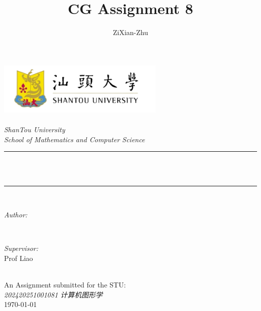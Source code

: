 
\title{CG Assignment 8}
\author{\textup{ZiXian-Zhu}}


\begin{titlepage}
    \newcommand{\HRule}{\rule{\linewidth}{0.5mm}}
    \pagecolor{gray!10} %
    \includegraphics[width=8cm]{figures/stu_logo_3-removebg-preview.png}\\[1cm] 
    \center 
    \quad\\[1.5cm]
    \textsl{\Large ShanTou University}\\[0.5cm] 
    \textsl{\large School of Mathematics and Computer Science}\\[0.5cm] 
    \makeatletter
    \HRule \\[0.4cm]
    { \huge \bfseries \@title}\\[0.4cm] 
    \HRule \\[1.5cm]
    \begin{minipage}{0.4\textwidth}
        \begin{flushleft} \large
            \emph{Author:}\\
            \@author 
        \end{flushleft}
    \end{minipage}
    ~
    \begin{minipage}{0.4\textwidth}
        \begin{flushright} \large
            \emph{Supervisor:} \\
            \textup{Prof Liao}
        \end{flushright}
    \end{minipage}\\[3cm]
    \makeatother
    {\large An Assignment submitted for the STU:}\\[0.5cm]
    {\large \emph{202420251001081 计算机图形学}}\\[0.5cm]
    {\large \today}\\[2cm] 
    \vfill 
\end{titlepage}



